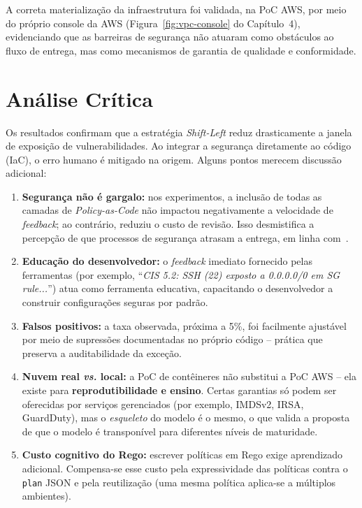 A correta materialização da infraestrutura foi validada, na PoC AWS, por meio do próprio console da AWS (Figura~\ref{fig:vpc-console} do Capítulo~4), evidenciando que as barreiras de segurança não atuaram como obstáculos ao fluxo de entrega, mas como mecanismos de garantia de qualidade e conformidade.

\section{Análise Crítica}

Os resultados confirmam que a estratégia \textit{Shift-Left} reduz drasticamente a janela de exposição de vulnerabilidades. Ao integrar a segurança diretamente ao código (IaC), o erro humano é mitigado na origem. Alguns pontos merecem discussão adicional:

\begin{enumerate}
    \item \textbf{Segurança não é gargalo:} nos experimentos, a inclusão de todas as camadas de \textit{Policy-as-Code} não impactou negativamente a velocidade de \textit{feedback}; ao contrário, reduziu o custo de revisão. Isso desmistifica a percepção de que processos de segurança atrasam a entrega, em linha com~.
    \item \textbf{Educação do desenvolvedor:} o \textit{feedback} imediato fornecido pelas ferramentas (por exemplo, ``\textit{CIS 5.2: SSH (22) exposto a 0.0.0.0/0 em SG rule...}'') atua como ferramenta educativa, capacitando o desenvolvedor a construir configurações seguras por padrão.
    \item \textbf{Falsos positivos:} a taxa observada, próxima a 5\%, foi facilmente ajustável por meio de supressões documentadas no próprio código -- prática que preserva a auditabilidade da exceção.
    \item \textbf{Nuvem real \textit{vs.} local:} a PoC de contêineres não substitui a PoC AWS -- ela existe para \textbf{reprodutibilidade e ensino}. Certas garantias só podem ser oferecidas por serviços gerenciados (por exemplo, IMDSv2, IRSA, GuardDuty), mas o \textit{esqueleto} do modelo é o mesmo, o que valida a proposta de que o modelo é transponível para diferentes níveis de maturidade.
    \item \textbf{Custo cognitivo do Rego:} escrever políticas em Rego exige aprendizado adicional. Compensa-se esse custo pela expressividade das políticas contra o \texttt{plan} JSON e pela reutilização (uma mesma política aplica-se a múltiplos ambientes).
\end{enumerate}

